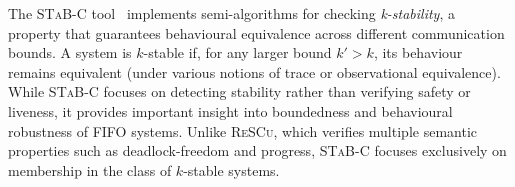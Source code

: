 The \textsc{STaB-C} tool~\cite{akroun2018automated,akroun2016automated} 
implements semi-algorithms for checking \emph{k-stability}, a property that 
guarantees behavioural equivalence across different communication bounds.  
A system is $k$-stable if, for any larger bound $k' > k$, its behaviour 
remains equivalent (under various notions of trace or observational 
equivalence).  
While \textsc{STaB-C} focuses on detecting stability rather than verifying 
safety or liveness, it provides important insight into boundedness and 
behavioural robustness of FIFO systems.  
Unlike \textsc{ReSCu}, which verifies multiple semantic properties such as 
deadlock-freedom and progress, \textsc{STaB-C} focuses exclusively on 
membership in the class of $k$-stable systems.
